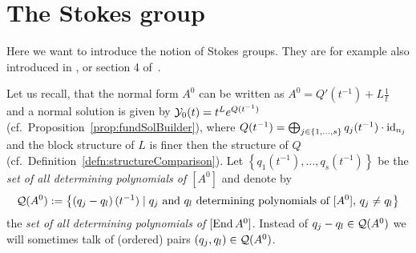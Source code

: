 \begin{comment}
      \textbf{``\Leftarrow{}'':}
      If for some suitable covering $(I_j)$ the cocycle $(\lambda_{jl})$ is a
      coboundary with values in $\Aut_\cA(\tilde\cM^{nf})$, i.e.\
      $\lambda_{jl}=f_lf_j^{-1}$, we define a new connection $\nabla$ on
      $\tilde\cM^{nf}$ by conjugating $\nabla^{nf}$ by $f_j$ on $U_j$.

      \TODO{}

      Moreover $\hat f_j=\hat f_l$ on $U_j\cap U_l$, so that the formal
      isomorphisms
      \[
        \hat f_j:(\hat \cM^{nf},\nabla)
        \overset{\sim}{\longrightarrow}
        (\hat\cM^{nf},\nabla^{nf})
      \]
      can be glued in an isomorphism $\hat f:(\hat \cM^{nf},\nabla)
      \overset{\sim}{\longrightarrow}(\hat\cM^{nf},\nabla^{nf})$.
    \end{proof}

    Thus, the proof of Theorem~\ref{thm:mainThm1} is a consequence of the
    following Theorem by Malgrange and Sibuya.
    \begin{thm}[Malgrange-Sibuya]\label{thm:malgSibuyaHelp}
      \marginnote{\cite[Thm.II.6.10]{sabbah2007isomonodromic}}
      The image of the mapping
      \[
        H^1(S^1;\Gl_d^{<0}(\cA_{\tilde D}))
        \to
        H^1(S^1;\Gl_d(\cA_{\tilde D}))
      \]
      is the identity.
    \end{thm}
    For the proof of Theorem~\ref{thm:malgSibuyaHelp} which we refer to
    \cite[Th.A.1]{Malgrange1983}, \cite[Th.6.4.1]{sibuya1990Linear} and
    \cite{babbitt1989local}.
  \end{proof}
\end{comment}
\fi

\section{The Stokes group}\label{sec:StokesGroup}
\PROBLEM[rewrite!]
Here we want to introduce the notion of Stokes groups. They are for example
also introduced in \cite{Loday1994}, \cite{Loday2014} or section 4
of~\cite{Martinet1991}.

Let us recall, that the normal form $A^0$ can be written as
$A^0=Q'(t^{-1})+L\frac{1}{t}$ and a normal solution is given by
$\mathcal{Y}_0(t)=t^Le^{Q(t^{-1})}$ (cf.\ Proposition~\ref{prop:fundSolBuilder}), where
$Q(t^{-1})=\bigoplus_{j\in\{1,\dots,s\}}q_j(t^{-1})\cdot\operatorname{id}_{n_j}$ and the
block structure of $L$ is finer then the structure of $Q$
(cf.\ Definition~\ref{defn:structureComparison}).
Let $\left\{q_1(t^{-1}),\dots,q_s(t^{-1})\right\}$ be the \emph{set of all
determining polynomials of $[A^0]$} and denote by
\[
  \mathcal{Q}(A^0):=\left\{\left(q_j-q_l\right)(t^{-1})
    \mid
    \text{$q_j$ and $q_l$ determining polynomials of $[A^0]$, }
    q_j \neq q_l
  \right\}
\]
the \emph{set of all determining polynomials of $[\operatorname{End} A^0]$}.
Instead of $q_j-q_l\in\mathcal{Q}(A^0)$ we will sometimes talk of (ordered) pairs
$(q_j,q_l)\in\mathcal{Q}(A^0)$.

